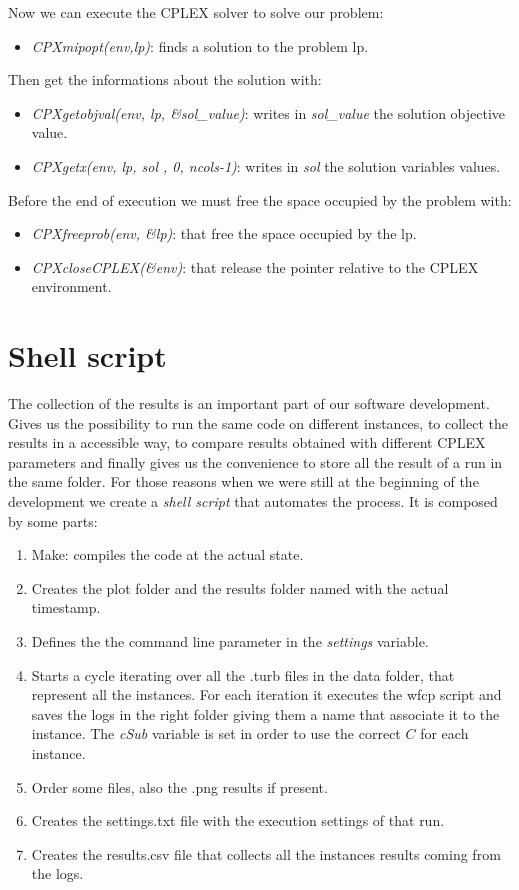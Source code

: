 \begin{appendices}
Now we can execute the \textsc{CPLEX} solver to solve our problem:
\begin{itemize}
\item \textit{CPXmipopt(env,lp)}: finds a solution to the problem lp.
\end{itemize}
Then get the informations about the solution with:
\begin{itemize}
\item \textit{CPXgetobjval(env, lp, \&sol\_value)}: writes in \textit{sol\_value} the solution objective value.
\item \textit{CPXgetx(env, lp, sol , 0, ncols-1)}: writes in \textit{sol} the solution variables values.
\end{itemize}

Before the end of execution we must free the space occupied by the problem with:
\begin{itemize}
\item \textit{CPXfreeprob(env, \&lp)}: that free the space occupied by the lp.
\item \textit{CPXcloseCPLEX(\&env)}: that release the pointer relative to the \textsc{CPLEX} environment.
\end{itemize}


\chapter{Shell script}
The collection of the results is an important part of our software development. Gives us the possibility to run the same code on different instances, to collect the results in a accessible way, to compare results obtained with different CPLEX parameters and finally gives us the convenience to store all the result of a run in the same folder. 
For those reasons when we were still at the beginning of the development we create a \textit{shell script} that automates the process. It is composed by some parts:
\begin{enumerate}
\item Make: compiles the code at the actual state.
\item Creates the plot folder and the results folder named with the actual timestamp.
\item Defines the the command line parameter in the \textit{settings} variable.
\item Starts a cycle iterating over all the .turb files in the data folder, that represent all the instances. For each iteration it executes the wfcp script and saves the logs in the right folder giving them a name that associate it to the instance. The \textit{cSub} variable is set in order to use the correct $C$ for each instance.
\item Order some files, also the .png results if present.
\item Creates the settings.txt file with the execution settings of that run.
\item Creates the results.csv file that collects all the instances results coming from the logs.
\end{enumerate}


\end{appendices}
